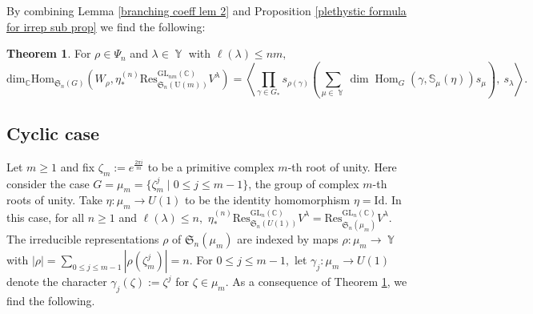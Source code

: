 \documentclass[12pt,reqno]{amsart}
\theoremstyle{definition}
\newtheorem{thm}{Theorem}[section]
\DeclareMathOperator{\Par}{\mathbb{Y}}
\DeclareMathOperator{\Hom}{\mathrm{Hom}}
\begin{document}
By combining Lemma \ref{branching coeff lem 2} and Proposition \ref{plethystic formula for irrep sub prop} we find the following:

\begin{thm}\label{main theorem}
For $\rho \in \Psi_n$ and $\lambda \in \Par$ with $\ell(\lambda) \leq n m ,$
    $$\mathrm{dim}_{\mathbb{C}} \mathrm{Hom}_{\mathfrak{S}_{n}(G)}\left( W_{\rho}, \eta^{(n)}_*\mathrm{Res}^{\mathrm{GL}_{nm}(\mathbb{C})}_{\mathfrak{S}_n(\mathrm{U}(m))} V^{\lambda} \right)= \left\langle \prod_{\gamma \in G_*} s_{\rho(\gamma)}\left(\sum_{\mu \in \Par} \dim \Hom_{G}(\gamma, \mathbb{S}_{\mu}(\eta)) s_{\mu}\right), ~ s_{\lambda} \right\rangle.$$
\end{thm}

\subsection{Cyclic case}

Let $m \geq 1$ and fix $\zeta_m:= e^{\frac{2 \pi i}{m}}$ to be a primitive complex $m$-th root of unity.
Here consider the case $G = \mu_m = \{\zeta_m^{j} \mid 0 \leq j \leq m-1\}$, the group of complex $m$-th roots of unity. Take $\eta:\mu_m \rightarrow U(1)$ to be the identity homomorphism $\eta = \mathrm{Id}$. In this case, for all $n \geq 1$ and $\ell(\lambda) \leq n,$ $\eta_{*}^{(n)} \mathrm{Res}_{\mathfrak{S}_n(U(1))}^{\mathrm{GL}_{n}(\mathbb{C})} V^{\lambda} = \mathrm{Res}_{\mathfrak{S}_n(\mu_m)}^{\mathrm{GL}_{n}(\mathbb{C})} V^{\lambda}.$ The irreducible representations $\rho$ of $\mathfrak{S}_n(\mu_m)$ are indexed by maps $\rho: \mu_m \rightarrow \Par$ with $|\rho| = \sum_{0 \leq j \leq m-1} | \rho(\zeta_m^{j})| = n.$ For $0 \leq j \leq m-1,$ let $\gamma_j : \mu_m \rightarrow U(1)$ denote the character $\gamma_j(\zeta):= \zeta^{j}$ for $\zeta \in \mu_m.$ As a consequence of Theorem \ref{main theorem}, we find the following. 
\end{document}
